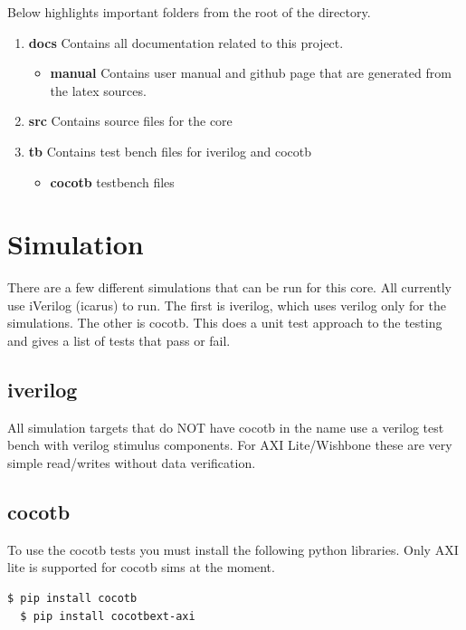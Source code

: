 \par
Below highlights important folders from the root of the directory.

\begin{enumerate}
  \item \textbf{docs} Contains all documentation related to this project.
    \begin{itemize}
      \item \textbf{manual} Contains user manual and github page that are generated from the latex sources.
    \end{itemize}
  \item \textbf{src} Contains source files for the core
  \item \textbf{tb} Contains test bench files for iverilog and cocotb
    \begin{itemize}
      \item \textbf{cocotb} testbench files
    \end{itemize}
\end{enumerate}

\newpage

\section{Simulation}
\par
There are a few different simulations that can be run for this core. All currently use iVerilog (icarus) to run. The first is iverilog, which
uses verilog only for the simulations. The other is cocotb. This does a unit test approach to the testing and gives a list of tests that pass
or fail.

\subsection{iverilog}
\par
All simulation targets that do NOT have cocotb in the name use a verilog test bench with verilog stimulus components. For AXI Lite/Wishbone these
are very simple read/writes without data verification.

\subsection{cocotb}
\par
To use the cocotb tests you must install the following python libraries. Only AXI lite is supported for cocotb sims at the moment.
\begin{lstlisting}[language=bash]
  $ pip install cocotb
  $ pip install cocotbext-axi
\end{lstlisting}

